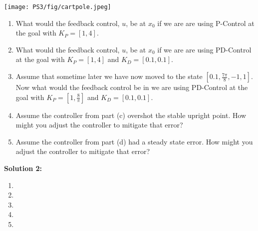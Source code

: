 \documentclass[]{article}
\begin{document}
\texttt{[image: PS3/fig/cartpole.jpeg]}

\begin{enumerate}[label=(\alph*)]
    \item What would the feedback control, $u$, be at $x_0$ if we are are using P-Control at the goal with $K_P = [1,4]$.
    \item What would the feedback control, $u$, be at $x_0$ if we are are using PD-Control at the goal with $K_P = [1,4]$ and $K_D = [0.1,0.1]$.
    \item Assume that sometime later we have now moved to the state $[0.1,\frac{7\pi}{8},-1,1]$. Now what would the feedback control be in we are using PD-Control at the goal with $K_P = [1,\frac{8}{\pi}]$ and $K_D = [0.1,0.1]$.
    \item Assume the controller from part (c) overshot the stable upright point. How might you adjust the controller to mitigate that error?
    \item Assume the controller from part (d) had a steady state error. How might you adjust the controller to mitigate that error?
\end{enumerate}

\textbf{Solution 2:}
\begin{enumerate}[label=(\alph*)]
    \item %
    \item %
    \item %
    \item %
    \item %
\end{enumerate}
\end{document}

